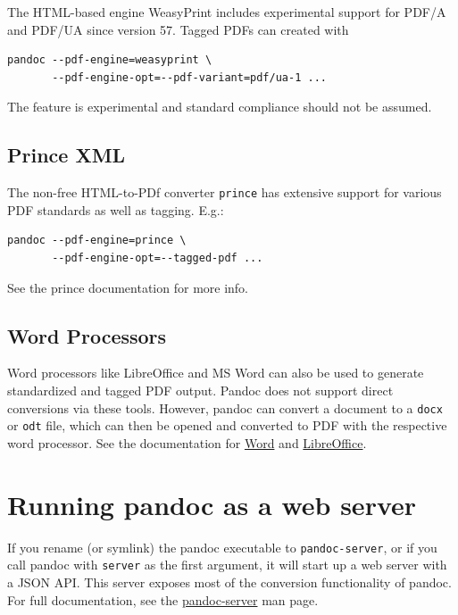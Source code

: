 \documentclass[
  b5paper
]{book}
\begin{document}
The HTML-based engine WeasyPrint includes experimental support for PDF/A
and PDF/UA since version 57. Tagged PDFs can created with

\begin{verbatim}
pandoc --pdf-engine=weasyprint \
       --pdf-engine-opt=--pdf-variant=pdf/ua-1 ...
\end{verbatim}

The feature is experimental and standard compliance should not be
assumed.

\section{Prince XML}\label{prince-xml}

The non-free HTML-to-PDf converter \texttt{prince} has extensive support
for various PDF standards as well as tagging. E.g.:

\begin{verbatim}
pandoc --pdf-engine=prince \
       --pdf-engine-opt=--tagged-pdf ...
\end{verbatim}

See the prince documentation for more info.

\section{Word Processors}\label{word-processors}

Word processors like LibreOffice and MS Word can also be used to
generate standardized and tagged PDF output. Pandoc does not support
direct conversions via these tools. However, pandoc can convert a
document to a \texttt{docx} or \texttt{odt} file, which can then be
opened and converted to PDF with the respective word processor. See the
documentation for
\href{https://support.microsoft.com/en-us/office/create-accessible-pdfs-064625e0-56ea-4e16-ad71-3aa33bb4b7ed}{Word}
and
\href{https://help.libreoffice.org/latest/en-US/text/shared/01/ref_pdf_export_general.html}{LibreOffice}.

\chapter{Running pandoc as a web
server}\label{running-pandoc-as-a-web-server}

If you rename (or symlink) the pandoc executable to
\texttt{pandoc-server}, or if you call pandoc with \texttt{server} as
the first argument, it will start up a web server with a JSON API. This
server exposes most of the conversion functionality of pandoc. For full
documentation, see the
\href{https://github.com/jgm/pandoc/blob/master/doc/pandoc-server.md}{pandoc-server}
man page.
\end{document}
